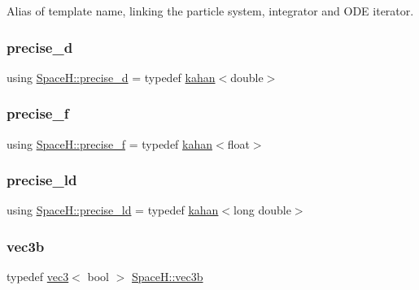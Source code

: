 Alias of template name, linking the particle system, integrator and O\+DE iterator. 

\mbox{\label{namespace_space_h_a50a1e263353add842b5f87190a4f9254}} 
\subsubsection{\texorpdfstring{precise\+\_\+d}{precise\_d}}
{\footnotesize\ttfamily using \mbox{\hyperlink{namespace_space_h_a50a1e263353add842b5f87190a4f9254}{Space\+H\+::precise\+\_\+d}} = typedef \mbox{\hyperlink{struct_space_h_1_1kahan}{kahan}}$<$double$>$}

\mbox{\label{namespace_space_h_a111f58b8dcf751e23fe4edd34ebf329e}} 
\subsubsection{\texorpdfstring{precise\+\_\+f}{precise\_f}}
{\footnotesize\ttfamily using \mbox{\hyperlink{namespace_space_h_a111f58b8dcf751e23fe4edd34ebf329e}{Space\+H\+::precise\+\_\+f}} = typedef \mbox{\hyperlink{struct_space_h_1_1kahan}{kahan}}$<$float$>$}

\mbox{\label{namespace_space_h_a97ab24f59c6eea385c71d6062b8535ed}} 
\subsubsection{\texorpdfstring{precise\+\_\+ld}{precise\_ld}}
{\footnotesize\ttfamily using \mbox{\hyperlink{namespace_space_h_a97ab24f59c6eea385c71d6062b8535ed}{Space\+H\+::precise\+\_\+ld}} = typedef \mbox{\hyperlink{struct_space_h_1_1kahan}{kahan}}$<$long double$>$}

\mbox{\label{namespace_space_h_a44ff82d7f587f8dfd3c71a7e0f7059b1}} 
\subsubsection{\texorpdfstring{vec3b}{vec3b}}
{\footnotesize\ttfamily typedef \mbox{\hyperlink{struct_space_h_1_1vec3}{vec3}}$<$ bool $>$ \mbox{\hyperlink{namespace_space_h_a44ff82d7f587f8dfd3c71a7e0f7059b1}{Space\+H\+::vec3b}}}


